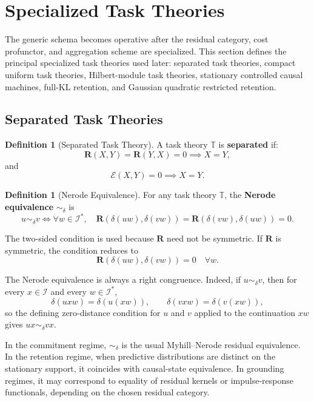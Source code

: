 \documentclass[12pt]{article}
\theoremstyle{definition}
\newtheorem{definition}[theorem]{Definition}
\begin{document}
\section{Specialized Task Theories}
\label{sec:specialized}

The generic schema becomes operative after the residual category, cost
profunctor, and aggregation scheme are specialized.  This section defines the
principal specialized task theories used later: separated task theories,
compact uniform task theories, Hilbert-module task theories, stationary
controlled causal machines, full-KL retention, and Gaussian quadratic
restricted retention.

\subsection{Separated Task Theories}
\label{subsec:separated}

\begin{definition}[Separated Task Theory]
\label{def:separated-task}
A task theory $\mathbb T$ is \textbf{separated} if:
\[
\mathbf R(X,Y)=\mathbf R(Y,X)=0
\implies
X=Y,
\]
and
\[
\mathcal E(X,Y)=0
\implies
X=Y.
\]
\end{definition}

\begin{definition}[Nerode Equivalence]
\label{def:nerode}
For any task theory $\mathbb T$, the \textbf{Nerode equivalence}
$\sim_\delta$ is
\[
u\sim_\delta v
\iff
\forall w\in\mathcal I^*,
\quad
\mathbf R(\delta(uw),\delta(vw))
=
\mathbf R(\delta(vw),\delta(uw))
=
0.
\]
\end{definition}

The two-sided condition is used because $\mathbf R$ need not be symmetric.  If
$\mathbf R$ is symmetric, the condition reduces to
\[
\mathbf R(\delta(uw),\delta(vw))=0
\quad
\forall w.
\]

The Nerode equivalence is always a right congruence.  Indeed, if
$u\sim_\delta v$, then for every $x\in\mathcal I$ and every
$w\in\mathcal I^*$,
\[
\delta(uxw)=\delta(u(xw)),
\qquad
\delta(vxw)=\delta(v(xw)),
\]
so the defining zero-distance condition for $u$ and $v$ applied to the
continuation $xw$ gives $ux\sim_\delta vx$.

In the commitment regime, $\sim_\delta$ is the usual Myhill--Nerode residual
equivalence.  In the retention regime, when predictive distributions are
distinct on the stationary support, it coincides with causal-state
equivalence.  In grounding regimes, it may correspond to equality of residual
kernels or impulse-response functionals, depending on the chosen residual
category.
\end{document}
